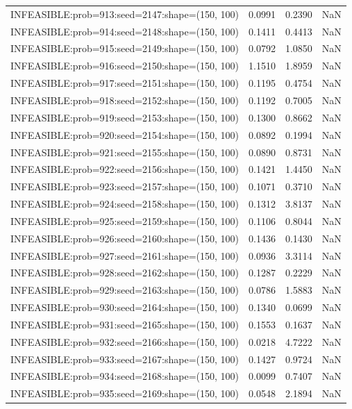 \begin{longtable}{lccc}
INFEASIBLE:prob=913:seed=2147:shape=(150, 100) & 0.0991 &  0.2390 &    NaN \\
INFEASIBLE:prob=914:seed=2148:shape=(150, 100) & 0.1411 &  0.4413 &    NaN \\
INFEASIBLE:prob=915:seed=2149:shape=(150, 100) & 0.0792 &  1.0850 &    NaN \\
INFEASIBLE:prob=916:seed=2150:shape=(150, 100) & 1.1510 &  1.8959 &    NaN \\
INFEASIBLE:prob=917:seed=2151:shape=(150, 100) & 0.1195 &  0.4754 &    NaN \\
INFEASIBLE:prob=918:seed=2152:shape=(150, 100) & 0.1192 &  0.7005 &    NaN \\
INFEASIBLE:prob=919:seed=2153:shape=(150, 100) & 0.1300 &  0.8662 &    NaN \\
INFEASIBLE:prob=920:seed=2154:shape=(150, 100) & 0.0892 &  0.1994 &    NaN \\
INFEASIBLE:prob=921:seed=2155:shape=(150, 100) & 0.0890 &  0.8731 &    NaN \\
INFEASIBLE:prob=922:seed=2156:shape=(150, 100) & 0.1421 &  1.4450 &    NaN \\
INFEASIBLE:prob=923:seed=2157:shape=(150, 100) & 0.1071 &  0.3710 &    NaN \\
INFEASIBLE:prob=924:seed=2158:shape=(150, 100) & 0.1312 &  3.8137 &    NaN \\
INFEASIBLE:prob=925:seed=2159:shape=(150, 100) & 0.1106 &  0.8044 &    NaN \\
INFEASIBLE:prob=926:seed=2160:shape=(150, 100) & 0.1436 &  0.1430 &    NaN \\
INFEASIBLE:prob=927:seed=2161:shape=(150, 100) & 0.0936 &  3.3114 &    NaN \\
INFEASIBLE:prob=928:seed=2162:shape=(150, 100) & 0.1287 &  0.2229 &    NaN \\
INFEASIBLE:prob=929:seed=2163:shape=(150, 100) & 0.0786 &  1.5883 &    NaN \\
INFEASIBLE:prob=930:seed=2164:shape=(150, 100) & 0.1340 &  0.0699 &    NaN \\
INFEASIBLE:prob=931:seed=2165:shape=(150, 100) & 0.1553 &  0.1637 &    NaN \\
INFEASIBLE:prob=932:seed=2166:shape=(150, 100) & 0.0218 &  4.7222 &    NaN \\
INFEASIBLE:prob=933:seed=2167:shape=(150, 100) & 0.1427 &  0.9724 &    NaN \\
INFEASIBLE:prob=934:seed=2168:shape=(150, 100) & 0.0099 &  0.7407 &    NaN \\
INFEASIBLE:prob=935:seed=2169:shape=(150, 100) & 0.0548 &  2.1894 &    NaN \\

\end{longtable}
